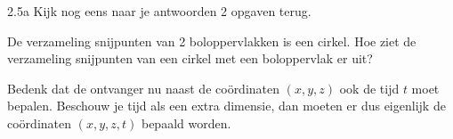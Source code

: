 \begin{Hint}{2.5a}
			Kijk nog eens naar je antwoorden 2 opgaven terug.
		
\end{Hint}
\begin{Hint}{4.9}
		De verzameling snijpunten van 2 boloppervlakken is een cirkel. Hoe ziet de verzameling snijpunten van een cirkel met een boloppervlak er uit?
	
\end{Hint}
\begin{Hint}{4.15}
		Bedenk dat de ontvanger nu naast de co\"ordinaten $(x, y, z)$ ook de tijd $t$ moet bepalen. Beschouw je tijd als een extra dimensie, dan moeten er dus eigenlijk de co\"ordinaten $(x, y, z, t)$ bepaald worden.
	
\end{Hint}
